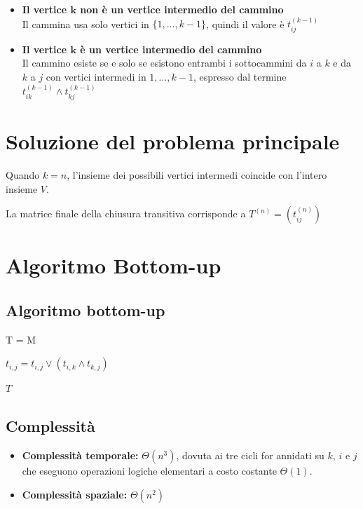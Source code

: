 \begin{itemize}
    \item \textbf{Il vertice $\mathbf{k}$ non è un vertice intermedio del cammino}\\
    Il cammina usa solo vertici in $\{1,\dots,k-1\}$, quindi il valore è $t_{ij}^{(k-1)}$

    \item \textbf{Il vertice $\mathbf{k}$ è un vertice intermedio del cammino}\\
    Il cammino esiste se e solo se esistono entrambi i sottocammini da $i$ a $k$ e da $k$ a $j$ con vertici intermedi in $1,\dots,k-1$, espresso dal termine $t_{ik}^{(k-1)} \land t_{kj}^{(k-1)}$
\end{itemize}

\section{Soluzione del problema principale}
Quando $k=n$, l'insieme dei possibili vertici intermedi coincide con l'intero insieme $V$.

La matrice finale della chiusura transitiva corrisponde a $T^{(n)} = (t_{ij}^{(n)})$

\section{Algoritmo Bottom-up}
\subsection{Algoritmo bottom-up}

\begin{algorithm}
    \begin{algorithmic}
            T = M 

                    \State $t_{i,j}=t_{i,j} \lor (t_{i,k} \land t_{k,j})$
                \EndFor
            \EndFor

            \State \Return $T$
        \EndProcedure
    \end{algorithmic}
\end{algorithm}

\subsection{Complessità}
\begin{itemize}
    \item \textbf{Complessità temporale:} $\Theta(n^3)$, dovuta ai tre cicli for annidati su $k$, $i$ e $j$ che eseguono operazioni logiche elementari a costo costante $\Theta(1)$.
    \item \textbf{Complessità spaziale:} $\Theta(n^2)$
\end{itemize}
